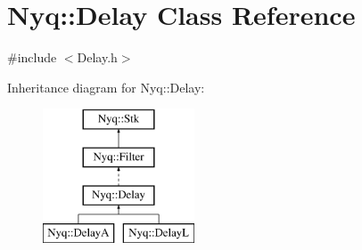 \hypertarget{class_nyq_1_1_delay}{}\section{Nyq\+:\+:Delay Class Reference}
\label{class_nyq_1_1_delay}


{\ttfamily \#include $<$Delay.\+h$>$}

Inheritance diagram for Nyq\+:\+:Delay\+:\begin{figure}[H]
\begin{center}
\leavevmode
\includegraphics[height=4.000000cm]{class_nyq_1_1_delay}
\end{center}
\end{figure}
